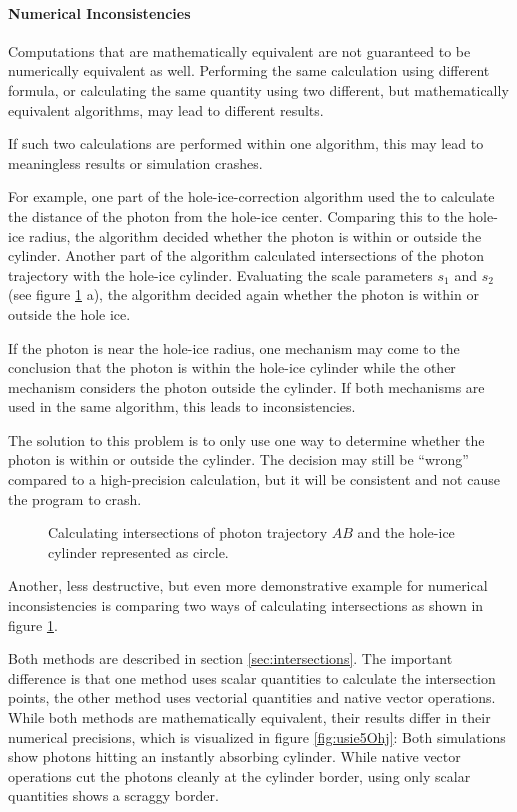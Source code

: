\paragraph{Numerical Inconsistencies}
Computations that are mathematically equivalent are not guaranteed to be numerically equivalent as well. Performing the same calculation using different formula, or calculating the same quantity using two different, but mathematically equivalent algorithms, may lead to different results.

If such two calculations are performed within one algorithm, this may lead to meaningless results or simulation crashes.

For example, one part of the hole-ice-correction algorithm used the  to calculate the distance of the photon from the hole-ice center. Comparing this to the hole-ice radius, the algorithm decided whether the photon is within or outside the cylinder. Another part of the algorithm calculated intersections of the photon trajectory with the hole-ice cylinder. Evaluating the scale parameters $s_1$ and $s_2$ (see figure \ref{fig:aeQuae2U} a), the algorithm decided again whether the photon is within or outside the hole ice.

If the photon is near the hole-ice radius, one mechanism may come to the conclusion that the photon is within the hole-ice cylinder while the other mechanism considers the photon outside the cylinder. If both mechanisms are used in the same algorithm, this leads to inconsistencies.

The solution to this problem is to only use one way to determine whether the photon is within or outside the cylinder. The decision may still be ``wrong'' compared to a high-precision calculation, but it will be consistent and not cause the program to crash.

\begin{figure}[htbp]
  \caption{Calculating intersections of photon trajectory $AB$ and the hole-ice cylinder represented as circle.}
  \label{fig:aeQuae2U}
\end{figure}


Another, less destructive, but even more demonstrative example for numerical inconsistencies is comparing two ways of calculating intersections as shown in figure \ref{fig:aeQuae2U}.

Both methods are described in section \ref{sec:intersections}. The important difference is that one method uses scalar quantities to calculate the intersection points, the other method uses vectorial quantities and native vector operations. While both methods are mathematically equivalent, their results differ in their numerical precisions, which is visualized in figure \ref{fig:usie5Ohj}: Both simulations show photons hitting an instantly absorbing cylinder. While native vector operations cut the photons cleanly at the cylinder border, using only scalar quantities shows a scraggy border.

